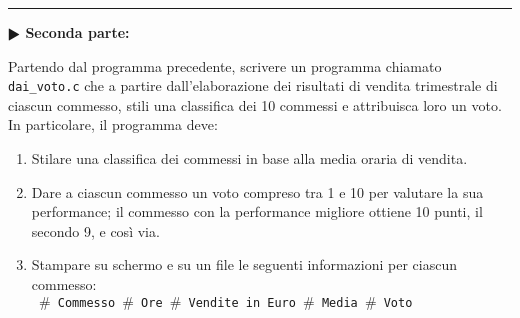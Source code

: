 \documentclass[11pt]{article}
\begin{document}
\hrule
\vspace{2mm}
\textbf{$\RHD$ Seconda parte:}

Partendo dal programma precedente, scrivere un programma chiamato \texttt{dai\_voto.c} che a partire dall'elaborazione dei risultati di
vendita trimestrale di ciascun commesso, stili una classifica dei 10 commessi e attribuisca loro
un voto. In particolare, il programma deve: 
\begin{enumerate}
\item Stilare una classifica dei commessi in base alla media oraria di vendita.
\item Dare a ciascun commesso un voto compreso tra 1 e 10 per valutare la sua performance; il commesso con la performance migliore ottiene 10 punti, il secondo 9, e così via.
\item Stampare su schermo e su un file le seguenti informazioni per ciascun commesso:\\
\texttt{
$\#$  Commesso $\#$ Ore $\#$ Vendite in Euro $\#$ Media $\#$ Voto\\
}
\end{enumerate}
\end{document}
